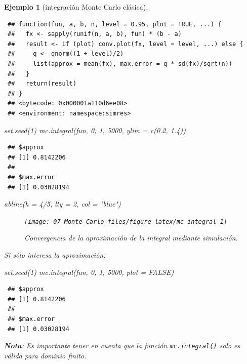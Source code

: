 \documentclass[
]{book}
\newenvironment{Shaded}{\begin{snugshade}}{\end{snugshade}}
\newcommand{\AttributeTok}[1]{\textcolor[rgb]{0.77,0.63,0.00}{#1}}
\newcommand{\ConstantTok}[1]{\textcolor[rgb]{0.00,0.00,0.00}{#1}}
\newcommand{\DecValTok}[1]{\textcolor[rgb]{0.00,0.00,0.81}{#1}}
\newcommand{\FloatTok}[1]{\textcolor[rgb]{0.00,0.00,0.81}{#1}}
\newcommand{\FunctionTok}[1]{\textcolor[rgb]{0.00,0.00,0.00}{#1}}
\newcommand{\NormalTok}[1]{#1}
\newcommand{\SpecialCharTok}[1]{\textcolor[rgb]{0.00,0.00,0.00}{#1}}
\newcommand{\StringTok}[1]{\textcolor[rgb]{0.31,0.60,0.02}{#1}}
\theoremstyle{break}
\newtheorem{example}{Ejemplo}[chapter]
\theoremstyle{nonumberplain}
\begin{document}
\begin{example}[integración Monte Carlo clásica]
\begin{verbatim}
 ## function(fun, a, b, n, level = 0.95, plot = TRUE, ...) {
 ##   fx <- sapply(runif(n, a, b), fun) * (b - a)
 ##   result <- if (plot) conv.plot(fx, level = level, ...) else {
 ##     q <- qnorm((1 + level)/2)
 ##     list(approx = mean(fx), max.error = q * sd(fx)/sqrt(n))
 ##   }
 ##   return(result)
 ## }
 ## <bytecode: 0x000001a110d6ee08>
 ## <environment: namespace:simres>
\end{verbatim}

\begin{Shaded}
\begin{Highlighting}[]
\FunctionTok{set.seed}\NormalTok{(}\DecValTok{1}\NormalTok{)}
\FunctionTok{mc.integral}\NormalTok{(fun, }\DecValTok{0}\NormalTok{, }\DecValTok{1}\NormalTok{, }\DecValTok{5000}\NormalTok{, }\AttributeTok{ylim =} \FunctionTok{c}\NormalTok{(}\FloatTok{0.2}\NormalTok{, }\FloatTok{1.4}\NormalTok{))}
\end{Highlighting}
\end{Shaded}

\begin{verbatim}
 ## $approx
 ## [1] 0.8142206
 ## 
 ## $max.error
 ## [1] 0.03028194
\end{verbatim}

\begin{Shaded}
\begin{Highlighting}[]
\FunctionTok{abline}\NormalTok{(}\AttributeTok{h =} \DecValTok{4}\SpecialCharTok{/}\DecValTok{5}\NormalTok{, }\AttributeTok{lty =} \DecValTok{2}\NormalTok{, }\AttributeTok{col =} \StringTok{"blue"}\NormalTok{)}
\end{Highlighting}
\end{Shaded}

\begin{figure}[!htb]

{\centering \texttt{[image: 07-Monte\_Carlo\_files/figure-latex/mc-integral-1]} 

}

\caption{Convergencia de la aproximación de la integral mediante simulación.}\label{fig:mc-integral}
\end{figure}

Si sólo interesa la aproximación:

\begin{Shaded}
\begin{Highlighting}[]
\FunctionTok{set.seed}\NormalTok{(}\DecValTok{1}\NormalTok{)}
\FunctionTok{mc.integral}\NormalTok{(fun, }\DecValTok{0}\NormalTok{, }\DecValTok{1}\NormalTok{, }\DecValTok{5000}\NormalTok{, }\AttributeTok{plot =} \ConstantTok{FALSE}\NormalTok{)}
\end{Highlighting}
\end{Shaded}

\begin{verbatim}
 ## $approx
 ## [1] 0.8142206
 ## 
 ## $max.error
 ## [1] 0.03028194
\end{verbatim}

\textbf{Nota}: Es importante tener en cuenta que la función \texttt{mc.integral()} solo es válida para dominio finito.
\end{example}
\end{document}
